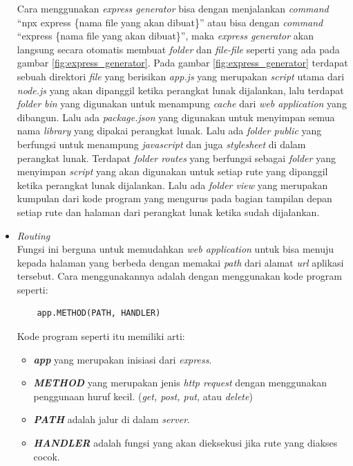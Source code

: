 \begin{itemize}
    Cara menggunakan \textit{express generator} bisa dengan menjalankan \textit{command} ``npx express \{nama file yang akan dibuat\}'' atau bisa dengan \textit{command} ``express \{nama file yang akan dibuat\}'', maka \textit{express generator} akan langsung secara otomatis membuat \textit{folder} dan \textit{file-file} seperti yang ada pada gambar \ref{fig:express_generator}. Pada gambar \ref{fig:express_generator} terdapat sebuah direktori \textit{file} yang berisikan \textit{app.js} yang merupakan \textit{script} utama dari \textit{node.js} yang akan dipanggil ketika perangkat lunak dijalankan, lalu terdapat \textit{folder} \textit{bin} yang digunakan untuk menampung \textit{cache} dari \textit{web application} yang dibangun. Lalu ada \textit{package.json} yang digunakan untuk menyimpan semua nama \textit{library} yang dipakai perangkat lunak. Lalu ada \textit{folder public} yang berfungsi untuk menampung \textit{javascript} dan juga \textit{stylesheet} di dalam perangkat lunak. Terdapat \textit{folder routes} yang berfungsi sebagai \textit{folder} yang menyimpan \textit{script} yang akan digunakan untuk setiap rute yang dipanggil ketika perangkat lunak dijalankan. Lalu ada \textit{folder view} yang merupakan kumpulan dari kode program yang mengurus pada bagian tampilan depan setiap rute dan halaman dari perangkat lunak ketika sudah dijalankan. 
    
    \item {\textit{Routing}}\\
    Fungsi ini berguna untuk memudahkan \textit{web application} untuk bisa menuju kepada halaman yang berbeda dengan memakai \textit{path} dari alamat \textit{url} aplikasi tersebut. Cara menggunakannya adalah dengan menggunakan kode program seperti:
    \begin{lstlisting}
    app.METHOD(PATH, HANDLER)
    \end{lstlisting}
    Kode program seperti itu memiliki arti:
    \begin{itemize}
        \item \textbf{\textit{app}} yang merupakan inisiasi dari \textit{express}.
        \item \textbf{\textit{METHOD}} yang merupakan jenis \textit{http request} dengan menggunakan penggunaan huruf kecil. (\textit{get, post, put,} atau \textit{delete})
        \item \textbf{\textit{PATH}} adalah jalur di dalam \textit{server}.
        \item \textbf{\textit{HANDLER}} adalah fungsi yang akan dieksekusi jika rute yang diakses cocok. 
    \end{itemize}
\end{itemize}

